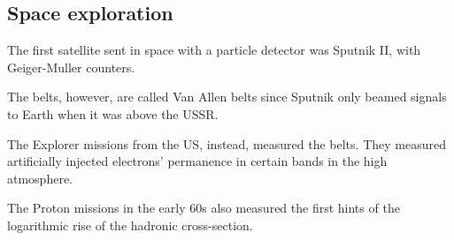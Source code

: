 \documentclass[main.tex]{subfiles}
\begin{document}
\subsection{Space exploration}

The first satellite sent in space with a particle detector was Sputnik II, with Geiger-Muller counters. 

The belts, however, are called Van Allen belts since Sputnik only beamed signals to Earth
when it was above the USSR. 

The Explorer missions from the US, instead, measured the belts. 
They measured artificially injected electrons' permanence in certain bands in the high atmosphere. 

The Proton missions in the early 60s also measured the first hints 
of the logarithmic rise of the hadronic cross-section.
\end{document}
